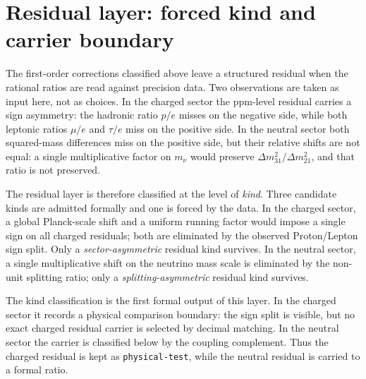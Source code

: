 \documentclass[11pt]{article}
\begin{document}
\section{Residual layer: forced kind and carrier boundary}

The first-order corrections classified above leave a structured residual
when the rational ratios are read against precision data.  Two
observations are taken as input here, not as choices.  In the charged
sector the ppm-level residual carries a sign asymmetry: the hadronic
ratio $p/e$ misses on the negative side, while both leptonic ratios
$\mu/e$ and $\tau/e$ miss on the positive side.  In the neutral sector
both squared-mass differences miss on the positive side, but their
relative shifts are not equal: a single multiplicative factor on
$m_\nu$ would preserve $\Delta m^2_{31}/\Delta m^2_{21}$, and that ratio
is not preserved.

The residual layer is therefore classified at the level of \emph{kind}.
Three candidate kinds are admitted formally and one is forced by the
data.  In the charged sector, a global Planck-scale shift and a uniform
running factor would impose a single sign on all charged residuals; both
are eliminated by the observed Proton/Lepton sign split.  Only a
\emph{sector-asymmetric} residual kind survives.  In the neutral sector,
a single multiplicative shift on the neutrino mass scale is eliminated
by the non-unit splitting ratio; only a \emph{splitting-asymmetric}
residual kind survives.

The kind classification is the first formal output of this layer.  In
the charged sector it records a physical comparison boundary: the sign
split is visible, but no exact charged residual carrier is selected by
decimal matching.  In the neutral sector the carrier is classified below
by the coupling complement.  Thus the charged residual is
kept as \texttt{physical-test}, while the neutral residual is carried to
a formal ratio.
\end{document}
